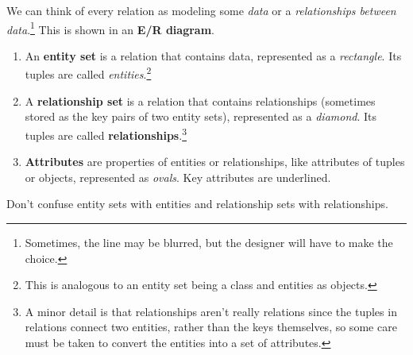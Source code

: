     \begin{definition} 
      We can think of every relation as modeling some \textit{data} or a \textit{relationships between data}.\footnote{Sometimes, the line may be blurred, but the designer will have to make the choice.} This is shown in an \textbf{E/R diagram}. 
      \begin{enumerate}
        \item An \textbf{entity set} is a relation that contains data, represented as a \textit{rectangle}. Its tuples are called \textit{entities}.\footnote{This is analogous to an entity set being a class and entities as objects.} 
        \item A \textbf{relationship set} is a relation that contains relationships (sometimes stored as the key pairs of two entity sets), represented as a \textit{diamond}. Its tuples are called \textbf{relationships}.\footnote{A minor detail is that relationships aren't really relations since the tuples in relations connect two entities, rather than the keys themselves, so some care must be taken to convert the entities into a set of attributes. }
        \item \textbf{Attributes} are properties of entities or relationships, like attributes of tuples or objects, represented as \textit{ovals}. Key attributes are underlined. 
      \end{enumerate}
      Don't confuse entity sets with entities and relationship sets with relationships. 
    \end{definition}

